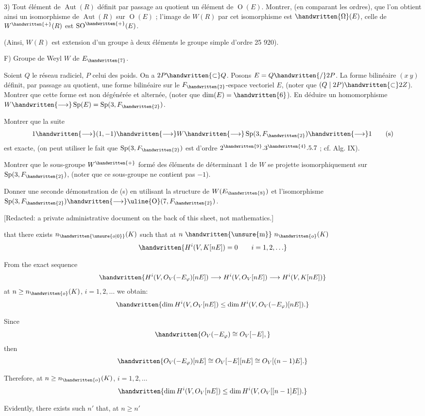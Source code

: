 3) Tout élément de $\operatorname{Aut}(R)$ définit par passage au quotient un élément de $\operatorname{O}(E)$. Montrer, (en comparant les ordres), que l'on obtient ainsi un isomorphisme de $\operatorname{Aut}(R)$ sur $\operatorname{O}(E)$ ; l'image de $W(R)$ par cet isomorphisme est $\handwritten{\Omega}(E)$, celle de $W^{\handwritten{+}}(R)$ est $\operatorname{SO}^{\handwritten{+}}(E)$.

(Ainsi, $W(R)$ est extension d'un groupe à deux éléments  le groupe simple d'ordre 25 920).

F) Groupe de Weyl $W$ de $E_{\handwritten{7}}$.

Soient $Q$ le réseau radiciel, $P$ celui des poids. On a $2P\handwritten{\subset}Q$. Posons $E=Q\handwritten{/}2P$. La forme bilinéaire $(x\ y)$ définit, par passage au quotient, une forme bilinéaire sur le $F_{\handwritten{2}}$-espace vectoriel $E$, (noter que $(Q\mid 2P)\handwritten{\subset}2Z$). Montrer que cette forme est non dégénérée et alternée, (noter que $\dim(E)=\handwritten{6}$). En déduire un homomorphisme $W\handwritten{\longrightarrow}\operatorname{Sp}(E)=\operatorname{Sp}(3,F_{\handwritten{2}})$.

Montrer que la suite
\[
1\handwritten{\longrightarrow}(1,-1)\handwritten{\longrightarrow}W\handwritten{\longrightarrow}\operatorname{Sp}(3,F_{\handwritten{2}})\handwritten{\longrightarrow}1
\tag*{(s)}
\]
est exacte, (on peut utiliser le fait que $\operatorname{Sp}(3,F_{\handwritten{2}})$ est d'ordre $2^{\handwritten{9}}.3^{\handwritten{4}}.5.7$ ; cf. Alg. IX).

Montrer que le sous-groupe $W^{\handwritten{+}}$ formé des éléments de déterminant 1 de $W$ se projette isomorphiquement sur $\operatorname{Sp}(3,F_{\handwritten{2}})$, (noter que ce sous-groupe ne contient pas $-1$).

Donner une seconde démonstration de (s) en utilisant la structure de $W(E_{\handwritten{8}})$ et l'isomorphisme $\operatorname{Sp}(3,F_{\handwritten{2}})\handwritten{\longrightarrow}\uline{\operatorname{O}}(7,F_{\handwritten{2}})$.

[Redacted: a private administrative document on the back of this sheet, not mathematics.]

that there exists $n_{\handwritten{\unsure{o|0}}}(K)$ such that at $n\ \handwritten{\unsure{\mathrm{m}}}\ n_{\handwritten{o}}(K)$
\[
\handwritten{H^i(V,K[nE])=0\qquad i=1,2,\ldots}
\]

From the exact sequence
\[
\handwritten{H^i(V,O_V(-E_\varphi)[nE])\longrightarrow H^i(V,O_V[nE])\longrightarrow H^i(V,K[nE])}
\]
at $n\geq n_{\handwritten{o}}(K)$, $i=1,2,\ldots$ we obtain:
\[
\handwritten{\dim H^i(V,O_V[nE])\leq\dim H^i(V,O_V(-E_\varphi)[nE]).}
\]

Since
\[
\handwritten{O_V(-E_\varphi)\cong O_V[-E],}
\]
then
\[
\handwritten{O_V(-E_\varphi)[nE]\cong O_V[-E][nE]\cong O_V[(n-1)E].}
\]

Therefore, at $n\geq n_{\handwritten{o}}(K)$, $i=1,2,\ldots$
\[
\handwritten{\dim H^i(V,O_V[nE])\leq\dim H^i(V,O_V[[n-1]E]).}
\]

Evidently, there exists such $n'$ that, at $n\geq n'$

